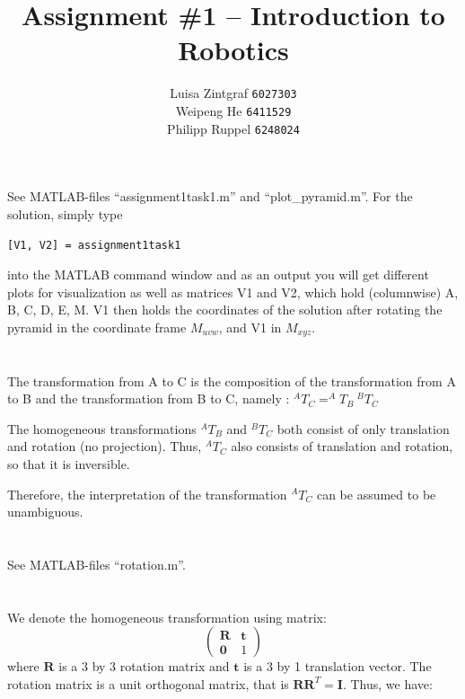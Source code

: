 \documentclass[a4paper,11pt]{article}
\title{Assignment \#1 -- Introduction to Robotics}
\author{
Luisa Zintgraf \texttt{6027303} \\
Weipeng He \texttt{6411529} \\
Philipp Ruppel \texttt{6248024}
}
\begin{document}
\maketitle

\section{}
See MATLAB-files ``assignment1task1.m'' and ``plot\_pyramid.m''.
For the solution, simply type
\begin{center}
  \texttt{[V1, V2] = assignment1task1}
\end{center}
into the MATLAB command window and as an output you will get different plots for
visualization as well as matrices V1 and V2, which hold (columnwise) A, B, C, D, E,
M. V1 then holds the coordinates of the solution after rotating the pyramid in the
coordinate frame $M_{uvw}$, and V1 in $M_{xyz}$.

\section{}
The transformation from A to C is the composition of the transformation from A to B and the transformation from B to C, namely : $^AT_C = ^AT_B ~ ^BT_C$

The homogeneous transformations $^AT_B$ and $^BT_C$ both consist of only translation and rotation (no projection). Thus, $^AT_C$ also consists of translation and rotation, so that it is inversible. 

Therefore, the interpretation of the transformation $^AT_C$ can be assumed to be unambiguous.

\section{}
See MATLAB-files ``rotation.m''.

\section{}
We denote the homogeneous transformation using matrix:
\[ \begin{pmatrix}
  \mathbf{R} & \mathbf{t} \\
  \mathbf{0} & 1 
\end{pmatrix} \]
where $\mathbf{R}$ is a 3 by 3 rotation matrix and $\mathbf{t}$ is a 3 by 1 translation vector.
The rotation matrix is a unit orthogonal matrix, that is $\mathbf{R}\mathbf{R}^T=\mathbf{I}$. Thus, we have:
\end{document}

